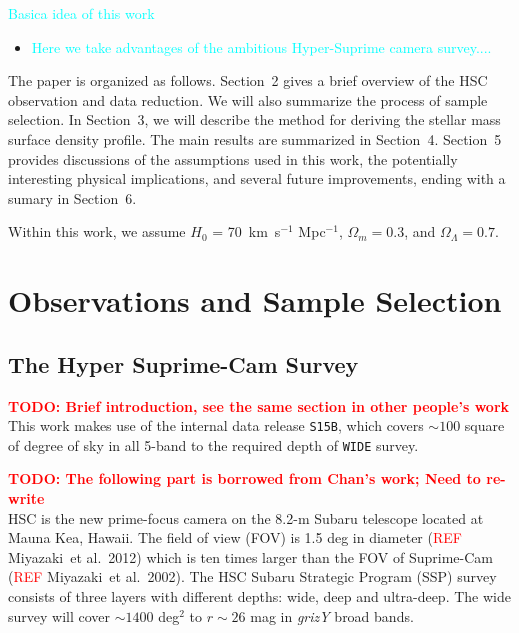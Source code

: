 \documentclass[preprint]{aastex}
\def\etal{{\ et al.~}}
\newcommand{\todo}[1]{\textcolor{red}{\textbf{TODO: #1}}}
\newcommand{\plan}[1]{\textcolor{cyan}{#1}}
\newcommand{\addref}[1]{\textcolor{red}{REF}}
\begin{document}
\begin{CJK*}{UTF8}{gbsn}
    \plan{Basica idea of this work}
    \begin{itemize}
        \item \plan{Here we take advantages of the ambitious Hyper-Suprime camera 
            survey....}
    \end{itemize}

    The paper is organized as follows. Section~2 gives a brief overview of the HSC
    observation and data reduction.  We will also summarize the process of sample
    selection.  In Section~3, we will describe the method for deriving the stellar mass 
    surface density profile.  The main results are summarized in Section~4.  Section~5 
    provides discussions of the assumptions used in this work, the potentially interesting
    physical implications, and several future improvements, ending with a sumary in
    Section~6.

    Within this work, we assume $H_0$ = 70~km~s$^{-1}$ Mpc$^{-1}$, ${\Omega}_m=0.3$, and
    ${\Omega}_{\Lambda}=0.7$.
    

\section{Observations and Sample Selection}

\subsection{The Hyper Suprime-Cam Survey}

    \todo{Brief introduction, see the same section in other people's work} \\

    This work makes use of the internal data release \texttt{S15B}, which covers $\sim 100$
    square of degree of sky in all 5-band to the required depth of \texttt{WIDE} survey.  

    \todo{The following part is borrowed from Chan's work; Need to re-write}\\
    HSC is the new prime-focus camera on the 8.2-m Subaru telescope located at Mauna Kea, 
    Hawaii.  The field of view (FOV) is 1.5 deg in diameter (\addref: Miyazaki\etal 2012) 
    which is ten times larger than the FOV of Suprime-Cam (\addref: Miyazaki\etal 2002). 
    The HSC Subaru Strategic Program (SSP) survey consists of three layers with different 
    depths: wide, deep and ultra-deep. The wide survey will cover $\sim1400$ deg$^2$ to 
    $r\sim26$ mag in {\it grizY} broad bands. 


\end{CJK*}
\end{document}
